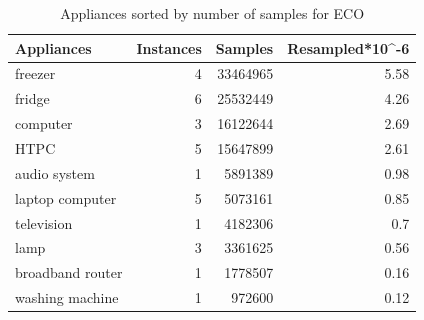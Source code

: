 \begin{table}[H]
    \centering
    \begin{tabular}{|l|r|r|r|}
    \hline
    \textbf{Appliances} & \multicolumn{1}{l|}{\textbf{Instances}} & \multicolumn{1}{l|}{\textbf{Samples}} & \multicolumn{1}{l|}{\textbf{Resampled*10\textasciicircum{}-6}} \\ \hline
    freezer             & 4                                       & 33464965                              & 5.58                                                        \\ \hline
    fridge              & 6                                       & 25532449                              & 4.26                                                        \\ \hline
    computer            & 3                                       & 16122644                              & 2.69                                                        \\ \hline
    HTPC                & 5                                       & 15647899                              & 2.61                                                        \\ \hline
    audio system        & 1                                       & 5891389                               & 0.98                                                         \\ \hline
    laptop computer     & 5                                       & 5073161                               & 0.85                                                         \\ \hline
    television          & 1                                       & 4182306                               & 0.7                                                         \\ \hline
    lamp                & 3                                       & 3361625                               & 0.56                                                         \\ \hline
    broadband router    & 1                                       & 1778507                               & 0.16                                                         \\ \hline
    washing machine     & 1                                       & 972600                                & 0.12                                                         \\ \hline
    \end{tabular}
    \caption{Appliances sorted by number of samples for ECO}
    \label{tab:eco_table}
\end{table}


